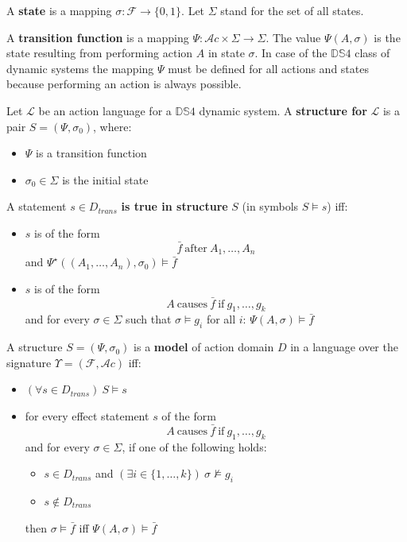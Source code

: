 \documentclass[11pt]{article}
\newcommand{\fluents}{\mathcal{F}}
\newcommand{\actions}{\mathcal{A}c}
\newcommand{\states}{\Sigma}
\newcommand{\parr}{\par\vspace{5mm}\noindent}
\begin{document}
\parr
A \textbf{state} is a mapping \(\sigma:\fluents\rightarrow\{0,1\}\).
Let \(\states\) stand for the set of all states.

\parr
A \textbf{transition function} is a mapping \(\Psi: \actions\times\states\rightarrow\states\).
The value \(\Psi(A, \sigma)\) is the state resulting from performing action \(A\) in state \(\sigma\).
In case of the \(\mathbb{DS}4\) class of dynamic systems the mapping \(\Psi\) must be defined for all
actions and states because performing an action is always possible.

\parr
Let \(\mathcal{L}\) be an action language for a \(\mathbb{DS}4\) dynamic system.
A \textbf{structure for} \(\mathcal{L}\) is a pair \(S=(\Psi, \sigma_0)\), where:
\begin{itemize}
    \item \(\Psi\) is a transition function
    \item \(\sigma_0\in\states\) is the initial state
\end{itemize}

\parr
A statement \(s \in D_{trans}\) \textbf{is true in structure} \(S\) (in symbols \(S\models s\)) iff:
\begin{itemize}
    \item \(s\) is of the form \[\bar{f} ~\text{after}~ A_1, \ldots, A_n\]
    and \(\Psi^\star((A_1, \ldots, A_n),\sigma_0)\models \bar{f}\)
    \item \(s\) is of the form \[A ~\text{causes}~ \bar{f} ~\text{if}~ g_1 ,\ldots, g_k\]
    and for every \(\sigma\in\states\) such that \(\sigma\models g_i\) for all \(i\):
    \(\Psi(A, \sigma)\models\bar{f}\)
\end{itemize}

\parr
A structure \(S=(\Psi, \sigma_0)\) is a \textbf{model} of action domain \(D\) in a language over
the signature \(\Upsilon=(\fluents,\actions)\) iff:
\begin{itemize}
    \item[(M1)] \((\forall s\in D_{trans})~ S\models s\)
    \item[(M2)] for every effect statement \(s\) of the form
    \[A ~\text{causes}~ \bar{f} ~\text{if}~ g_1 ,\ldots, g_k\]
    and for every \(\sigma\in\states\), if one of the following holds:
    \begin{itemize}
        \item[(a)] \(s\in D_{trans}\) and \((\exists i\in\{1,\ldots,k\})~ \sigma\nvDash g_i\)
        \item[(b)] \(s\notin D_{trans}\)
    \end{itemize}
    then \(\sigma \models \bar{f}\) iff \(\Psi(A,\sigma)\models \bar{f}\)
\end{itemize}
\end{document}
